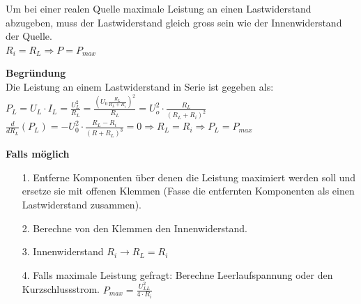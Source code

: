 \beginip
Um bei einer realen Quelle maximale Leistung an einen Lastwiderstand abzugeben, muss der Lastwiderstand gleich gross sein wie der Innenwiderstand der Quelle. \\
\formulaBegin
$ R_i = R_L \Rightarrow P = P_{max}$
\formulaEnd
\begin{center}
\end{center}
\iend
\textbf{Begründung} \\
Die Leistung an einem Lastwiderstand in Serie ist gegeben als: \\
$ \displaystyle P_L = U_L \cdot I_L = \frac{U_L^2}{R_L} = \frac{( U_0 \frac{R_L}{R_L + R_i})^2}{R_L} = U_o^2 \cdot \frac{R_L}{(R_L + R_i)^2}$ \\
$\displaystyle \frac{d}{dR_L} (P_L) = - U_0^2 \cdot \frac{R_L - R_i}{(R + R_L)^3} = 0 \Rightarrow R_L = R_i  \Rightarrow P_L = P_{max}$





















\beginvor
\textbf{Falls möglich}
\begin{itemize}
	\item [1. ] Entferne Komponenten über denen die Leistung maximiert werden soll und ersetze sie mit offenen Klemmen (Fasse die entfernten Komponenten als einen Lastwiderstand zusammen).
	\item [2. ] Berechne von den Klemmen den Innenwiderstand.
	\item [3. ] Innenwiderstand $R_i \rightarrow R_L = R_i$
	\item [4. ] Falls maximale Leistung gefragt: Berechne Leerlaufspannung oder den Kurzschlussstrom. $\displaystyle P_{max} = \frac{U_{LL}^2} {4 \cdot R_i } $
\end{itemize}

